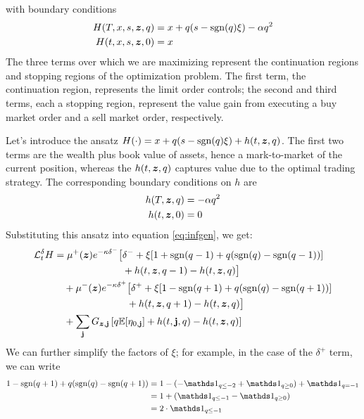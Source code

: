 with boundary conditions
\begin{align}
H(T, x, s, \bm{z}, q) & = x + q(s - \mathrm{sgn}(q)\xi) - \alpha q^2 \\
H(t, x, s, \bm{z}, 0) & = x
\end{align}
The three terms over which we are maximizing represent the continuation regions and stopping regions of the optimization problem. The first term, the continuation region, represents the limit order controls; the second and third terms, each a stopping region, represent the value gain from executing a buy market order and a sell market order, respectively.

Let's introduce the ansatz $H(\cdot) = x + q(s - \mathrm{sgn}(q)\xi) + h(t,\bm{z},q)$. The first two terms are the wealth plus book value of assets, hence a mark-to-market of the current position, whereas the $h(t,\bm{z},q)$ captures value due to the optimal trading strategy. The corresponding boundary conditions on $h$ are
\begin{align}
h(T, \bm{z}, q) & = - \alpha q^2 \\
h(t, \bm{z}, 0) & = 0
\end{align}
Substituting this ansatz into equation \ref{eq:infgen}, we get:
\begin{equation}
\begin{split}
\cL^{\delta}_t H & = \mu^+(\bz) e^{ -\kappa \delta^{-}} \bigl[ \delta^- + \xi [ 1 + \mathrm{sgn}(q-1) + q(\mathrm{sgn}(q) - \mathrm{sgn}(q-1) ) ] \\
& \hphantom{ {}={} \mu^+(\bz) e^{ -\kappa \delta^{-}} \bigl[ } + h(t,\bz,q-1) - h(t,\bz,q) \bigr] \\
& \quad + \mu^-(\bz) e^{ -\kappa \delta^{+}} \bigl[ \delta^+ + \xi [ 1 - \mathrm{sgn}(q+1) + q(\mathrm{sgn}(q) - \mathrm{sgn}(q+1) ) ] \\
& \hphantom{\quad + \mu^-(\bz) e^{ -\kappa \delta^{+}} \bigl[} + h(t,\bz,q+1) - h(t,\bz,q) \bigr] \\
& \quad + \sum_{\bj} G_{\bz,\bj} \left[q \E [\eta_{0,\bj}] +h(t,\bj,q) - h(t,\bz, q) \right]
\end{split}
\end{equation}
We can further simplify the factors of $\xi$; for example, in the case of the $\delta^+$ term, we can write
\begin{align*}
1 - \mathrm{sgn}(q+1) + q(\mathrm{sgn}(q) - \mathrm{sgn}(q+1) )  & = 
1 - (- \indicator_{q \leq -2} + \indicator_{q \geq 0}) +  \indicator_{q = -1} \\
& = 1 + ( \indicator_{q \leq -1} -  \indicator_{q \geq 0} )\\
& = 2 \cdot \indicator_{q \leq -1}
\end{align*}
